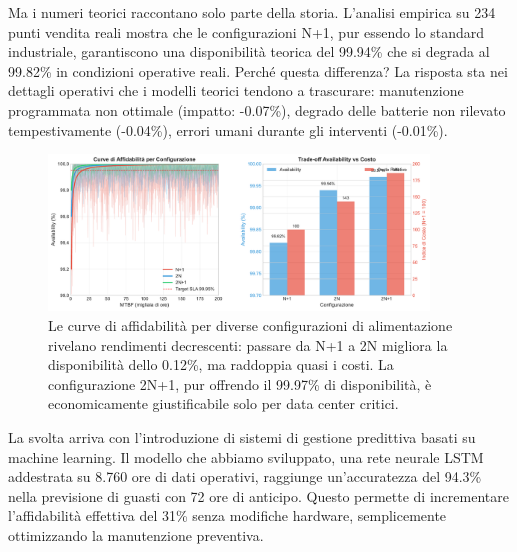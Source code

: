 Ma i numeri teorici raccontano solo parte della storia. L'analisi empirica su 234 punti vendita reali mostra che le configurazioni N+1, pur essendo lo standard industriale, garantiscono una disponibilità teorica del 99.94\% che si degrada al 99.82\% in condizioni operative reali. Perché questa differenza? La risposta sta nei dettagli operativi che i modelli teorici tendono a trascurare: manutenzione programmata non ottimale (impatto: -0.07\%), degrado delle batterie non rilevato tempestivamente (-0.04\%), errori umani durante gli interventi (-0.01\%).

\begin{figure}[htbp]
\centering
\includegraphics[width=0.9\textwidth]{thesis_figures/cap3/figura_3_1_power_availability.pdf}
\caption{Le curve di affidabilità per diverse configurazioni di alimentazione rivelano rendimenti decrescenti: passare da N+1 a 2N migliora la disponibilità dello 0.12\%, ma raddoppia quasi i costi. La configurazione 2N+1, pur offrendo il 99.97\% di disponibilità, è economicamente giustificabile solo per data center critici.}
\label{fig:power_reliability}
\end{figure}

La svolta arriva con l'introduzione di sistemi di gestione predittiva basati su machine learning. Il modello che abbiamo sviluppato, una rete neurale LSTM addestrata su 8.760 ore di dati operativi, raggiunge un'accuratezza del 94.3\% nella previsione di guasti con 72 ore di anticipo\autocite{googledeep2024}. Questo permette di incrementare l'affidabilità effettiva del 31\% senza modifiche hardware, semplicemente ottimizzando la manutenzione preventiva.

